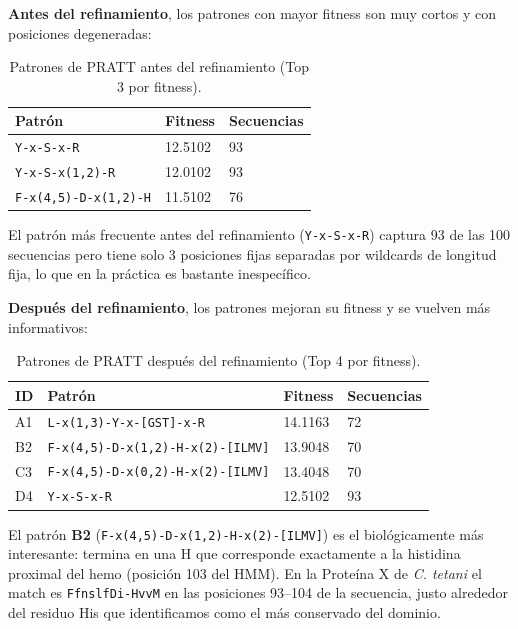 \textbf{Antes del refinamiento}, los patrones con mayor fitness son muy cortos y con
posiciones degeneradas:

\begin{table}[H]
\centering
\footnotesize
\begin{tabular}{P{5.5cm}P{2cm}P{2cm}}
\toprule
Patrón & Fitness & Secuencias \\
\midrule
\texttt{Y-x-S-x-R}        & 12.5102 & 93 \\
\texttt{Y-x-S-x(1,2)-R}   & 12.0102 & 93 \\
\texttt{F-x(4,5)-D-x(1,2)-H} & 11.5102 & 76 \\
\bottomrule
\end{tabular}
\caption{Patrones de PRATT antes del refinamiento (Top 3 por fitness).}
\end{table}

El patrón más frecuente antes del refinamiento (\texttt{Y-x-S-x-R}) captura 93 de las 100
secuencias pero tiene solo 3 posiciones fijas separadas por wildcards de longitud fija, lo
que en la práctica es bastante inespecífico.

\textbf{Después del refinamiento}, los patrones mejoran su fitness y se vuelven más informativos:

\begin{table}[H]
\centering
\footnotesize
\begin{tabular}{P{1cm}P{5.5cm}P{2cm}P{2cm}}
\toprule
ID & Patrón & Fitness & Secuencias \\
\midrule
A1 & \texttt{L-x(1,3)-Y-x-[GST]-x-R}          & 14.1163 & 72 \\
B2 & \texttt{F-x(4,5)-D-x(1,2)-H-x(2)-[ILMV]} & 13.9048 & 70 \\
C3 & \texttt{F-x(4,5)-D-x(0,2)-H-x(2)-[ILMV]} & 13.4048 & 70 \\
D4 & \texttt{Y-x-S-x-R}                         & 12.5102 & 93 \\
\bottomrule
\end{tabular}
\caption{Patrones de PRATT después del refinamiento (Top 4 por fitness).}
\end{table}

El patrón \textbf{B2} (\texttt{F-x(4,5)-D-x(1,2)-H-x(2)-[ILMV]}) es el biológicamente más
interesante: termina en una H que corresponde exactamente a la histidina proximal del hemo
(posición 103 del HMM). En la Proteína X de \textit{C. tetani} el match es
\texttt{FfnslfDi-HvvM} en las posiciones 93--104 de la secuencia, justo alrededor del
residuo His que identificamos como el más conservado del dominio.

